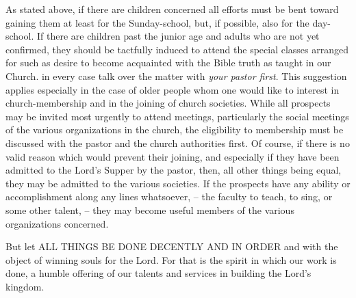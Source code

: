 \documentclass[
]{book}
\begin{document}
As stated above, if there are children concerned all efforts must be bent toward gaining them at least for the Sunday-school, but, if possible, also for the day-school. If there are children past the junior age and adults who are not yet confirmed, they should be tactfully induced to attend the special classes arranged for such as desire to become acquainted with the Bible truth as taught in our Church. in every case talk over the matter with \emph{your pastor first}. This suggestion applies especially in the case of older people whom one would like to interest in church-membership and in the joining of church societies. While all prospects may be invited most urgently to attend meetings, particularly the social meetings of the various organizations in the church, the eligibility to membership must be discussed with the pastor and the church authorities first. Of course, if there is no valid reason which would prevent their joining, and especially if they have been admitted to the Lord's Supper by the pastor, then, all other things being equal, they may be admitted to the various societies. If the prospects have any ability or accomplishment along any lines whatsoever, -- the faculty to teach, to sing, or some other talent, -- they may become useful members of the various organizations concerned.

But let ALL THINGS BE DONE DECENTLY AND IN ORDER and with the object of winning souls for the Lord. For that is the spirit in which our work is done, a humble offering of our talents and services in building the Lord's kingdom.
\end{document}
